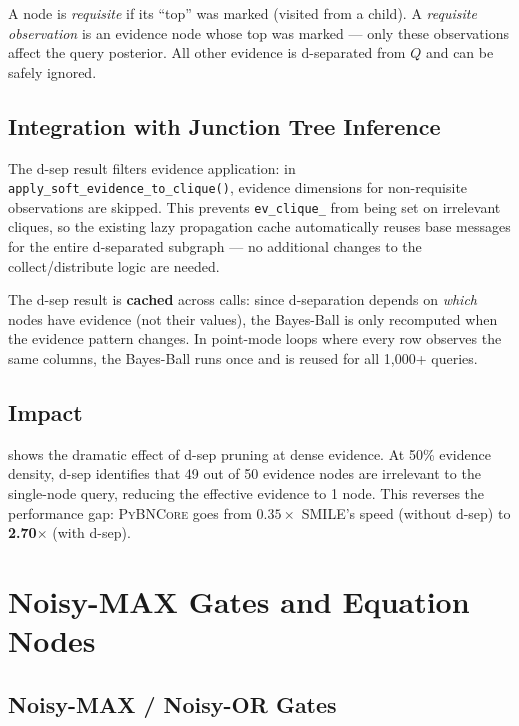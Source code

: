 \documentclass[11pt, letterpaper]{article}
\newcommand{\bncore}{\textsc{PyBNCore}}
\newcommand{\smiletool}{\textsc{SMILE}}
\theoremstyle{definitionstyle}
\begin{document}
\noindent
A node is \emph{requisite} if its ``top'' was marked (visited from a
child). A \emph{requisite observation} is an evidence node whose top was
marked --- only these observations affect the query posterior. All other
evidence is d-separated from $Q$ and can be safely ignored.

\subsection{Integration with Junction Tree Inference}

The d-sep result filters evidence application: in
\texttt{apply\_soft\_evidence\_to\_clique()}, evidence dimensions for
non-requisite observations are skipped. This prevents \texttt{ev\_clique\_}
from being set on irrelevant cliques, so the existing lazy propagation
cache automatically reuses base messages for the entire d-separated
subgraph --- no additional changes to the collect/distribute logic are needed.

The d-sep result is \textbf{cached} across calls: since d-separation
depends on \emph{which} nodes have evidence (not their values), the
Bayes-Ball is only recomputed when the evidence pattern changes. In
point-mode loops where every row observes the same columns, the
Bayes-Ball runs once and is reused for all 1{,}000+ queries.

\subsection{Impact}

 shows the dramatic effect of d-sep pruning
at dense evidence. At 50\% evidence density, d-sep identifies that
49 out of 50 evidence nodes are irrelevant to the single-node query,
reducing the effective evidence to 1 node. This reverses the performance
gap: \bncore{} goes from $0.35\times$ \smiletool{}'s speed (without d-sep)
to \textbf{2.70$\times$} (with d-sep).


\section{Noisy-MAX Gates and Equation Nodes}
\label{sec:noisy}

\subsection{Noisy-MAX / Noisy-OR Gates}
\end{document}
